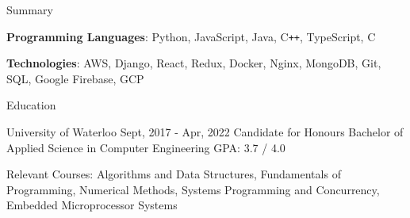 \documentclass{resume} %
\begin{document}
	\begin{rSection}{Summary}
		\begin{rSummarySection} {
			\item \textbf{Programming Languages}:  Python, JavaScript, Java, C\texttt{++}, TypeScript, C
			\item \textbf{Technologies}: AWS, Django, React, Redux, Docker, Nginx, MongoDB, Git, SQL, Google Firebase, GCP
		}
		\end{rSummarySection}
	\end{rSection}

	\vspace{-0.5em}
	\begin{rSection}{Education}
		\begin{rUniversitySection}
		{University of Waterloo}
		{Sept, 2017 - Apr, 2022}
		{Candidate for Honours Bachelor of Applied Science in Computer Engineering}
		{GPA: 3.7 / 4.0}
		{\item Relevant Courses: Algorithms and Data Structures, Fundamentals of Programming, Numerical Methods, Systems Programming and Concurrency, Embedded Microprocessor Systems}
		\end{rUniversitySection}
	\end{rSection}
\end{document}
